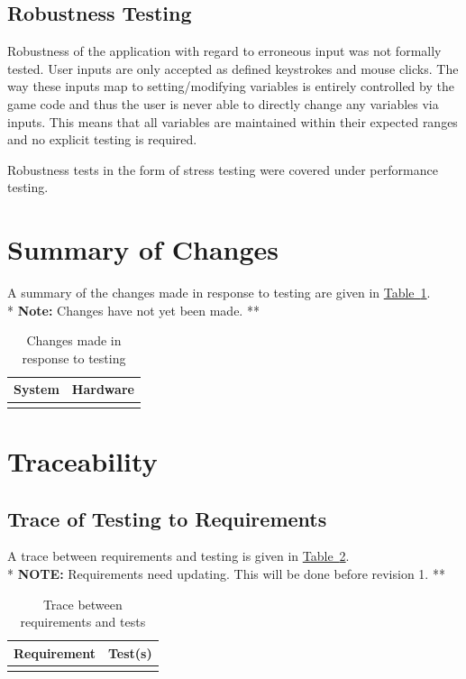 \documentclass[12pt, titlepage]{article}
\begin{document}
\subsection{Robustness Testing}
Robustness of the application with regard to erroneous input was not formally tested.  User inputs are only accepted as defined keystrokes and mouse clicks.  The way these inputs map to setting/modifying variables is entirely controlled by the game code and thus the user is never able to directly change any variables via inputs.  This means that all variables are maintained within their expected ranges and no explicit testing is required.

Robustness tests in the form of stress testing were covered under performance testing.

\section{Summary of Changes}
A summary of the changes made in response to testing are given in \hyperref[tab:changes]{Table~\ref*{tab:changes}}.\\

\noindent** {\bf Note:} Changes have not yet been made. **

\begin{table}[ht]
\caption{Changes made in response to testing} \label{tab:changes}
\begin{tabularx}{\textwidth}{p{5cm}X}
\toprule {\bf System} & {\bf Hardware}\\
\midrule
\\
\bottomrule
\end{tabularx}
\end{table}

\section{Traceability}
\subsection{Trace of Testing to Requirements}
A trace between requirements and testing is given in \hyperref[tab:tracereq]{Table~\ref*{tab:tracereq}}.\\

\noindent** {\bf NOTE:}  Requirements need updating.  This will be done before revision 1. **

\begin{table}[ht]
\caption{Trace between requirements and tests} \label{tab:tracereq}
\begin{tabularx}{\textwidth}{p{5cm}X}
\toprule {\bf Requirement} & {\bf Test(s)}\\
\midrule
&\\
\bottomrule
\end{tabularx}
\end{table}
\end{document}
